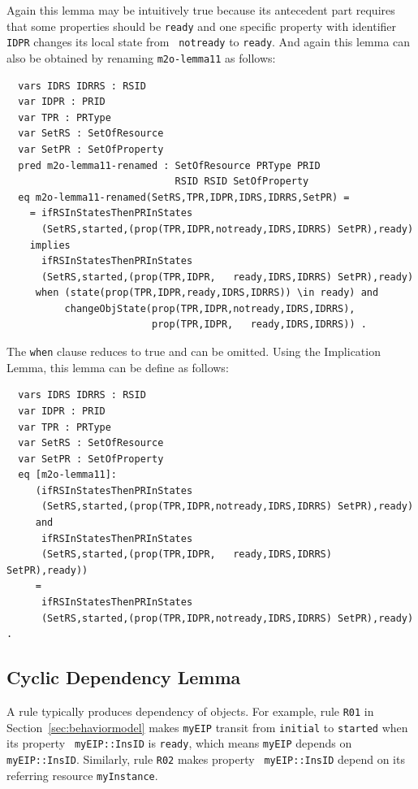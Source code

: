 \documentclass[12pt]{report}
\begin{document}
\normalsize
Again this lemma may be intuitively true because its antecedent part
requires that some properties should be {\tt ready} and one specific
property with identifier {\tt IDPR} changes its local state from {\tt
  notready} to {\tt ready}. And again this lemma can also be obtained by
renaming {\tt m2o-lemma11} as follows:
\small
\begin{verbatim}
  vars IDRS IDRRS : RSID 
  var IDPR : PRID
  var TPR : PRType
  var SetRS : SetOfResource
  var SetPR : SetOfProperty
  pred m2o-lemma11-renamed : SetOfResource PRType PRID 
                             RSID RSID SetOfProperty
  eq m2o-lemma11-renamed(SetRS,TPR,IDPR,IDRS,IDRRS,SetPR) =
    = ifRSInStatesThenPRInStates
      (SetRS,started,(prop(TPR,IDPR,notready,IDRS,IDRRS) SetPR),ready)
    implies
      ifRSInStatesThenPRInStates
      (SetRS,started,(prop(TPR,IDPR,   ready,IDRS,IDRRS) SetPR),ready)
     when (state(prop(TPR,IDPR,ready,IDRS,IDRRS)) \in ready) and 
          changeObjState(prop(TPR,IDPR,notready,IDRS,IDRRS),
                         prop(TPR,IDPR,   ready,IDRS,IDRRS)) .
\end{verbatim}
\normalsize
The {\tt when} clause reduces to true and can be omitted. Using the
Implication Lemma, this lemma can be define as follows:
\small
\begin{verbatim}
  vars IDRS IDRRS : RSID 
  var IDPR : PRID
  var TPR : PRType
  var SetRS : SetOfResource
  var SetPR : SetOfProperty
  eq [m2o-lemma11]:
     (ifRSInStatesThenPRInStates
      (SetRS,started,(prop(TPR,IDPR,notready,IDRS,IDRRS) SetPR),ready)
     and
      ifRSInStatesThenPRInStates
      (SetRS,started,(prop(TPR,IDPR,   ready,IDRS,IDRRS) SetPR),ready))
     = 
      ifRSInStatesThenPRInStates
      (SetRS,started,(prop(TPR,IDPR,notready,IDRS,IDRRS) SetPR),ready) .
\end{verbatim}
\normalsize

\subsection{Cyclic Dependency Lemma}
\label{sec:cyclelemma}
A rule typically produces dependency of objects.  For example, rule
{\tt R01} in Section~\ref{sec:behaviormodel} makes {\tt myEIP} transit
from {\tt initial} to {\tt started} when its property {\tt
  myEIP::InsID} is {\tt ready}, which means {\tt myEIP} depends on
{\tt myEIP::InsID}.  Similarly, rule {\tt R02} makes property {\tt
  myEIP::InsID} depend on its referring resource {\tt myInstance}.
\end{document}
